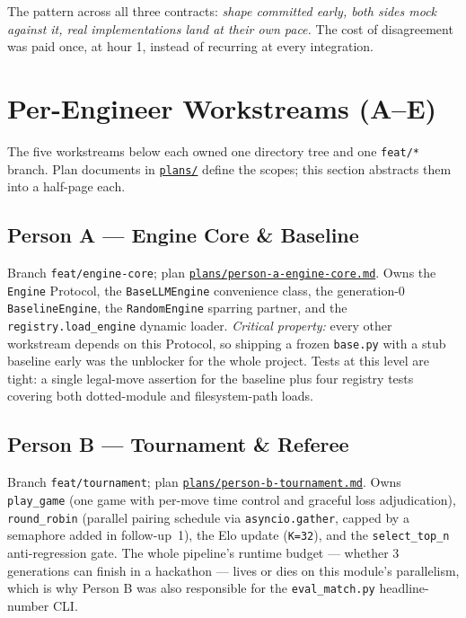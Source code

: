 \documentclass[11pt]{article}
\begin{document}
The pattern across all three contracts: \emph{shape committed early,
both sides mock against it, real implementations land at their own
pace.} The cost of disagreement was paid once, at hour 1, instead of
recurring at every integration.

\section{Per-Engineer Workstreams (A--E)}
\label{sec:workstreams}

The five workstreams below each owned one directory tree and one
\texttt{feat/*} branch. Plan documents in
\href{run:../plans/}{\texttt{plans/}} define the scopes; this section
abstracts them into a half-page each.

\subsection{Person A --- Engine Core \& Baseline}
Branch \texttt{feat/engine-core}; plan
\href{run:../plans/person-a-engine-core.md}{\texttt{plans/person-a-engine-core.md}}.
Owns the \texttt{Engine} Protocol, the
\texttt{BaseLLMEngine} convenience class, the generation-0
\texttt{BaselineEngine}, the \texttt{RandomEngine} sparring partner,
and the \texttt{registry.load\_engine} dynamic loader. \emph{Critical
property:} every other workstream depends on this Protocol, so
shipping a frozen \texttt{base.py} with a stub baseline early was the
unblocker for the whole project. Tests at this level are tight: a
single legal-move assertion for the baseline plus four registry tests
covering both dotted-module and filesystem-path loads.

\subsection{Person B --- Tournament \& Referee}
Branch \texttt{feat/tournament}; plan
\href{run:../plans/person-b-tournament.md}{\texttt{plans/person-b-tournament.md}}.
Owns \texttt{play\_game} (one game with per-move time control and
graceful loss adjudication), \texttt{round\_robin} (parallel pairing
schedule via \texttt{asyncio.gather}, capped by a semaphore added in
follow-up~1), the Elo update (\texttt{K=32}), and the
\texttt{select\_top\_n} anti-regression gate. The whole pipeline's
runtime budget --- whether 3 generations can finish in a hackathon ---
lives or dies on this module's parallelism, which is why Person B was
also responsible for the \texttt{eval\_match.py} headline-number CLI.
\end{document}
